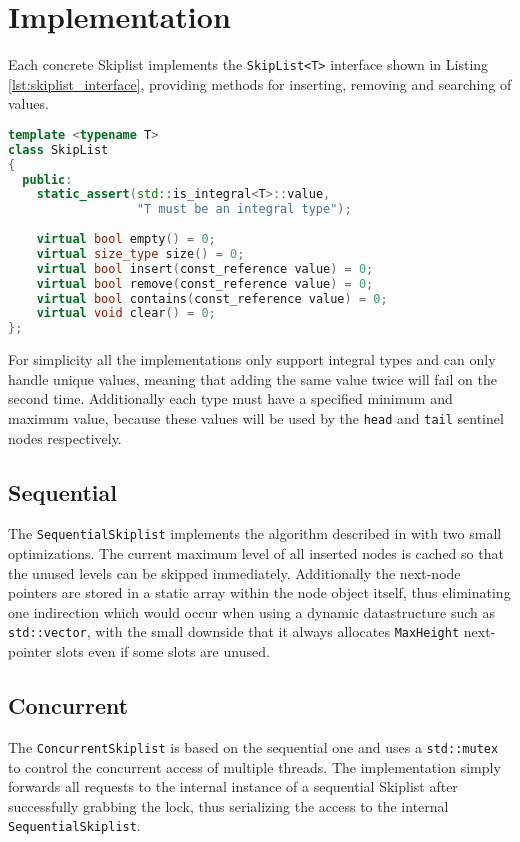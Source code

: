 \section{Implementation}

Each concrete Skiplist implements the \texttt{SkipList<T>} interface shown in Listing \ref{lst:skiplist_interface}, providing methods for inserting, removing and searching of values.

\begin{lstlisting}[language=C++, caption={Skiplist Interface}, label=lst:skiplist_interface]
template <typename T>
class SkipList
{
  public:
    static_assert(std::is_integral<T>::value, 
                  "T must be an integral type");
    
    virtual bool empty() = 0;
    virtual size_type size() = 0;
    virtual bool insert(const_reference value) = 0;
    virtual bool remove(const_reference value) = 0;
    virtual bool contains(const_reference value) = 0;
    virtual void clear() = 0;
};
\end{lstlisting}
\noindent For simplicity all the implementations only support integral types and can only handle unique values, meaning that adding the same value twice will fail on the second time. Additionally each type must have a specified minimum and maximum value, because these values will be used by the \texttt{head} and \texttt{tail} sentinel nodes respectively.


\subsection{Sequential}
The \texttt{SequentialSkiplist} implements the algorithm described in \cite{Herlihy:2008:AMP:1734069} with two small optimizations. The current maximum level of all inserted nodes is cached so that the unused levels can be skipped immediately. Additionally the next-node pointers are stored in a static array within the node object itself, thus eliminating one indirection which would occur when using a dynamic datastructure such as \texttt{std::vector}, with the small downside that it always allocates \texttt{MaxHeight} next-pointer slots even if some slots are unused.

\subsection{Concurrent}
The \texttt{ConcurrentSkiplist} is based on the sequential one and uses a \texttt{std::mutex} to control the concurrent access of multiple threads. The implementation simply forwards all requests to the internal instance of a sequential Skiplist after successfully grabbing the lock, thus serializing the access to the internal \texttt{SequentialSkiplist}.


